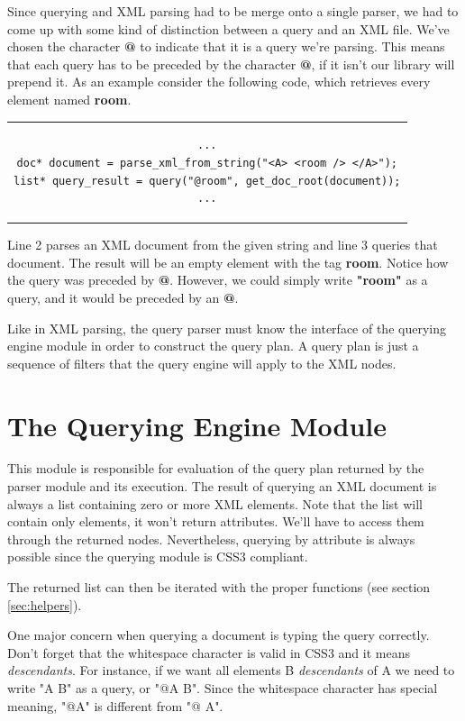 \documentclass[a4paper]{report}
\begin{document}
		Since querying and XML parsing had to be merge onto a single parser, we had to come up with some kind of distinction between a query and an XML file. We've chosen the character \textbf{@} to indicate that it is a 
		query we're parsing. This means that each query has to be preceded by the character \textbf{@}, if it isn't our library will prepend it. As an example consider the following code, which retrieves every element named 
		\textbf{room}.
		
\begin{center}
	\lstset{language=C,numbers=left, captionpos=b, caption=Sample query to a DOM tree.}
		\begin{tabular}{c}
	\begin{lstlisting}		
...
doc* document = parse_xml_from_string("<A> <room /> </A>");
list* query_result = query("@room", get_doc_root(document));
...
	\end{lstlisting}		
	\end{tabular}
	\end{center}
	
		Line 2 parses an XML document from the given string and line 3 queries that document. The result will be an empty element with the tag \textbf{room}. Notice how the query was preceded by \textbf{@}. However,
		we could simply write \textbf{"room"} as a query, and it would be preceded by an \textbf{@}.
			
		Like in XML parsing, the query parser must know the interface of the querying engine module in order to construct the query plan. A query plan is just a sequence of filters that the query engine will apply to the XML
		nodes.
		
\section{The Querying Engine Module}\label{sec:sels}
	This module is responsible for evaluation of the query plan returned by the parser module and its execution. The result of querying an XML document is always a list containing zero or more XML elements. Note that the list
	will contain only elements, it won't return attributes. We'll have to access them through the returned nodes. Nevertheless, querying by attribute is always possible since the querying module is CSS3 compliant.

	The returned list can then be iterated with the proper functions (see section \ref{sec:helpers}).

	One major concern when querying a document is typing the query correctly. Don't forget that the whitespace character is valid in CSS3 and it means \emph{descendants}. For instance, if we want all elements B 
	\emph{descendants} of A we need to write "A B" as a query, or "@A B". Since the whitespace character has special meaning, "@A" is different from "@ A". 	
	
\end{document}

